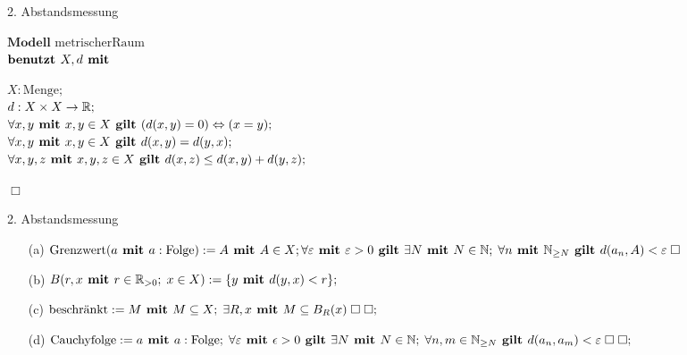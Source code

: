 \documentclass{article}
\begin{document}
\begin{flashcard}{2. Abstandsmessung}


\backside

\vspace*{1cm}

$\textbf{Modell } \text{metrischerRaum}$ \\
  $\textbf{benutzt } X,d \with$
  \begin{tabulator}
    $X : \text{Menge};$ \\
    $d : X \times X \rightarrow \R;$ \\
    $\forall x,y \with x,y \in X \then (d(x,y) = 0) \Leftrightarrow (x=y);$ \\
    $\forall x,y \with x,y \in X \then d(x,y) = d(y,x);$ \\
    $\forall x,y,z \with x,y,z \in X \then d(x,z) \leq d(x,y) + d(y,z);$
    \end{tabulator}
  $\Box$


\end{flashcard}




\begin{flashcard}{2. Abstandsmessung}


 \backside

\begin{itemize}
\item[(a)] $\text{Grenzwert}(a \with a:\text{Folge}) := A \with A \in X; \forall \varepsilon
 \with \varepsilon > 0 \then \exists N \with N \in \N; \; \forall n \with
 \N_{\geq N} \then d(a_{n}, A) < \varepsilon \; \Box$

\item[(b)] $B(r,x \with r \in \R_{>0}; \; x \in X) := \{y \with d(y,x) < r\};$

\item[(c)] $\text{beschränkt} := M \with M \subseteq X; \; \exists R,x \with M
  \subseteq B_{R}(x) \; \Box \; \Box;$
\item[(d)] $\text{Cauchyfolge} := a \with a:\text{Folge}; \; \forall \varepsilon
  \with \epsilon > 0 \then \exists N \with N \in \N; \; \forall
  n,m \in \N_{\geq N} \then d(a_{n}, a_{m}) < \varepsilon \; \Box \; \Box;$
\end{itemize}
\end{flashcard}
\end{document}
